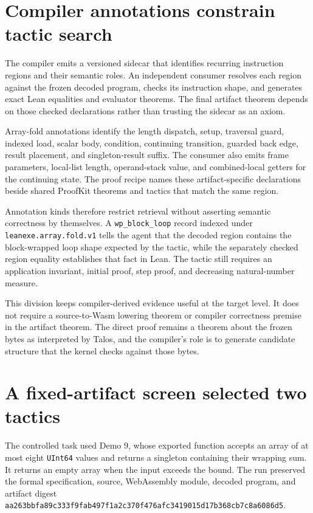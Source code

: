 \documentclass[10pt]{article}
\newcommand{\code}[1]{\texttt{#1}}
\begin{document}
\section{Compiler annotations constrain tactic search}

The compiler emits a versioned sidecar that identifies recurring instruction regions and their semantic roles.  An independent consumer resolves each region against the frozen decoded program, checks its instruction shape, and generates exact Lean equalities and evaluator theorems.  The final artifact theorem depends on those checked declarations rather than trusting the sidecar as an axiom.

Array-fold annotations identify the length dispatch, setup, traversal guard, indexed load, scalar body, condition, continuing transition, guarded back edge, result placement, and singleton-result suffix.  The consumer also emits frame parameters, local-list length, operand-stack value, and combined-local getters for the continuing state.  The proof recipe names these artifact-specific declarations beside shared ProofKit theorems and tactics that match the same region.

Annotation kinds therefore restrict retrieval without asserting semantic correctness by themselves.  A \code{wp\_block\_loop} record indexed under \code{leanexe.array.fold.v1} tells the agent that the decoded region contains the block-wrapped loop shape expected by the tactic, while the separately checked region equality establishes that fact in Lean.  The tactic still requires an application invariant, initial proof, step proof, and decreasing natural-number measure.

This division keeps compiler-derived evidence useful at the target level.  It does not require a source-to-Wasm lowering theorem or compiler correctness premise in the artifact theorem.  The direct proof remains a theorem about the frozen bytes as interpreted by Talos, and the compiler's role is to generate candidate structure that the kernel checks against those bytes.

\section{A fixed-artifact screen selected two tactics}

The controlled task used Demo 9, whose exported function accepts an array of at most eight \code{UInt64} values and returns a singleton containing their wrapping sum.  It returns an empty array when the input exceeds the bound.  The run preserved the formal specification, source, WebAssembly module, decoded program, and artifact digest \code{aa263bbfa89c333f9fab497f1a2c370f476afc3419015d17b368cb7c8a6086d5}.
\end{document}
